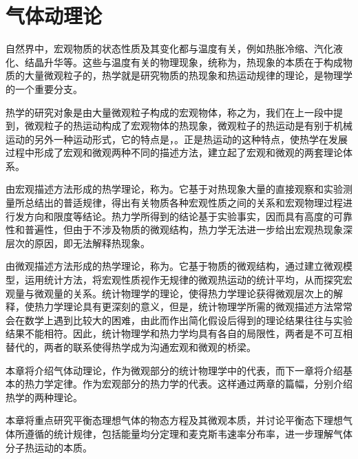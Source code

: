 \chapter{气体动理论}
\label{chap:气体动理论}
自然界中，宏观物质的状态性质及其变化都与温度有关，例如热胀冷缩、汽化液化、结晶升华等。这些与温度有关的物理现象，统称为，热现象的本质在于构成物质的大量微观粒子的，热学就是研究物质的热现象和热运动规律的理论，是物理学的一个重要分支。

热学的研究对象是由大量微观粒子构成的宏观物体，称之为，我们在上一段中提到，微观粒子的热运动构成了宏观物体的热现象，微观粒子的热运动是有别于机械运动的另外一种运动形式，它的特点是，。正是热运动的这种特点，使热学在发展过程中形成了宏观和微观两种不同的描述方法，建立起了宏观和微观的两套理论体系。

由宏观描述方法形成的热学理论，称为。它基于对热现象大量的直接观察和实验测量所总结出的普适规律，得出有关物质各种宏观性质之间的关系和宏观物理过程进行发方向和限度等结论。热力学所得到的结论基于实验事实，因而具有高度的可靠性和普遍性，但由于不涉及物质的微观结构，热力学无法进一步给出宏观热现象深层次的原因，即无法解释热现象。

由微观描述方法形成的热学理论，称为。它基于物质的微观结构，通过建立微观模型，运用统计方法，将宏观性质视作无规律的微观热运动的统计平均，从而探究宏观量与微观量的关系。统计物理学的理论，使得热力学理论获得微观层次上的解释，使热力学理论具有更深刻的意义，但是，统计物理学所需的微观描述方法常常会在数学上遇到比较大的困难，由此而作出简化假设后得到的理论结果往往与实验结果不能相符。因此，统计物理学和热力学均具有各自的局限性，两者是不可互相替代的，两者的联系使得热学成为沟通宏观和微观的桥梁。

本章将介绍气体动理论，作为微观部分的统计物理学中的代表，而下一章将介绍基本的热力学定律。作为宏观部分的热力学的代表。这样通过两章的篇幅，分别介绍热学的两种理论。

本章将重点研究平衡态理想气体的物态方程及其微观本质，并讨论平衡态下理想气体所遵循的统计规律，包括能量均分定理和麦克斯韦速率分布率，进一步理解气体分子热运动的本质。






